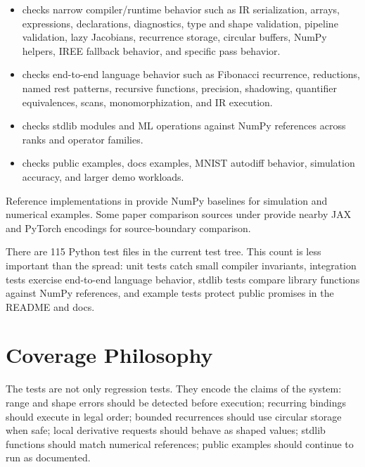 \begin{itemize}
\item {} checks narrow compiler/runtime behavior such as IR
serialization, arrays, expressions, declarations, diagnostics, type and shape
validation, pipeline validation, lazy Jacobians, recurrence storage, circular
buffers, NumPy helpers, IREE fallback behavior, and specific pass behavior.
\item {} checks end-to-end language behavior such as
Fibonacci recurrence, reductions, named rest patterns, recursive functions,
precision, shadowing, quantifier equivalences, scans, monomorphization, and IR
execution.
\item {} checks stdlib modules and ML operations against
NumPy references across ranks and operator families.
\item {} checks public examples, docs examples, MNIST
autodiff behavior, simulation accuracy, and larger demo workloads.
\end{itemize}

Reference implementations in 
provide NumPy baselines for simulation and numerical examples. Some paper
comparison sources under  provide nearby JAX and
PyTorch encodings for source-boundary comparison.

There are 115 Python test files in the current test tree. This count is less
important than the spread: unit tests catch small compiler invariants,
integration tests exercise end-to-end language behavior, stdlib tests compare
library functions against NumPy references, and example tests protect public
promises in the README and docs.

\section{Coverage Philosophy}

The tests are not only regression tests. They encode the claims of the system:
range and shape errors should be detected before execution; recurring bindings
should execute in legal order; bounded recurrences should use circular storage
when safe; local derivative requests should behave as shaped values; stdlib
functions should match numerical references; public examples should continue to
run as documented.
